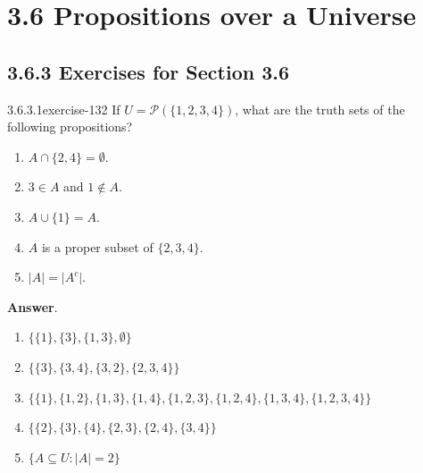 \documentclass[twoside,10pt,]{book}
\numberwithin{equation}{section}
\begin{document}
\section*{3.6 Propositions over a Universe}
\subsection*{3.6.3 Exercises for Section 3.6}
\begin{divisionsolution}{3.6.3.1}{}{exercise-132}%
\hypertarget{p-1263}{}%
If \(U = \mathcal{P}( \{1, 2, 3, 4\})\), what are the truth sets of the following propositions?%
\par
\hypertarget{p-1264}{}%
\leavevmode%
\begin{enumerate}[label=(\alph*)]
\item\hypertarget{li-716}{}\hypertarget{p-1265}{}%
\(A \cap  \{2, 4\} = \emptyset\).%
\item\hypertarget{li-717}{}\hypertarget{p-1266}{}%
\(3 \in  A\) and \(1 \notin  A\).%
\item\hypertarget{li-718}{}\hypertarget{p-1267}{}%
\(A \cup  \{1\} = A\).%
\item\hypertarget{li-719}{}\hypertarget{p-1268}{}%
\(A\) is a proper subset of \(\{2, 3, 4\}\).%
\item\hypertarget{li-720}{}\hypertarget{p-1269}{}%
\(\lvert A \rvert=\lvert A^c \rvert\).%
\end{enumerate}
%
\par\smallskip%
\noindent\textbf{Answer}.\quad%
\hypertarget{p-1270}{}%
\leavevmode%
\begin{enumerate}[label=(\alph*)]
\item\hypertarget{li-721}{}\hypertarget{p-1271}{}%
\(\{\{1\},\{3\},\{1,3\},\emptyset\}\)%
\item\hypertarget{li-722}{}\hypertarget{p-1272}{}%
\(\{\{3\}, \{3,4\}, \{3,2\}, \{2,3,4\}\}\)%
\item\hypertarget{li-723}{}\hypertarget{p-1273}{}%
\(\{\{1\}, \{1,2\}, \{1,3\}, \{1,4\}, \{1,2,3\}, \{1,2,4\}, \{1,3,4\}, \{1,2,3,4\}\}\)%
\item\hypertarget{li-724}{}\hypertarget{p-1274}{}%
\(\{\{2\}, \{3\}, \{4\}, \{2,3\}, \{2,4\}, \{3,4\}\}\)%
\item\hypertarget{li-725}{}\hypertarget{p-1275}{}%
\(\{A\subseteq U:\left| A\right| =2\}\)%
\end{enumerate}
%
\end{divisionsolution}%
\end{document}
